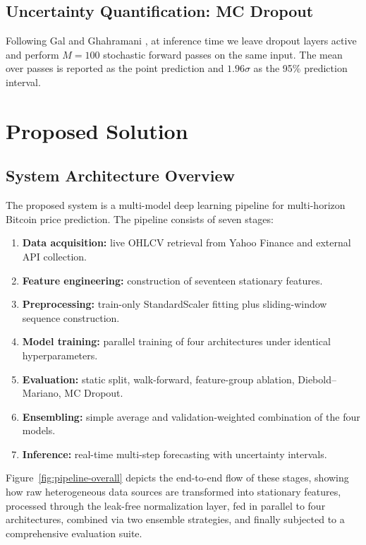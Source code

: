 \documentclass[12pt]{article}
\begin{document}
\subsection{Uncertainty Quantification: MC Dropout}

Following Gal and Ghahramani \cite{galghahramani2016}, at inference time we leave dropout layers active and perform $M = 100$ stochastic forward passes on the same input. The mean over passes is reported as the point prediction and $1.96\sigma$ as the 95\% prediction interval.

\section{Proposed Solution}

\subsection{System Architecture Overview}

The proposed system is a multi-model deep learning pipeline for multi-horizon Bitcoin price prediction. The pipeline consists of seven stages:
\begin{enumerate}[leftmargin=*]
    \item \textbf{Data acquisition:} live OHLCV retrieval from Yahoo Finance and external API collection.
    \item \textbf{Feature engineering:} construction of seventeen stationary features.
    \item \textbf{Preprocessing:} train-only StandardScaler fitting plus sliding-window sequence construction.
    \item \textbf{Model training:} parallel training of four architectures under identical hyperparameters.
    \item \textbf{Evaluation:} static split, walk-forward, feature-group ablation, Diebold--Mariano, MC Dropout.
    \item \textbf{Ensembling:} simple average and validation-weighted combination of the four models.
    \item \textbf{Inference:} real-time multi-step forecasting with uncertainty intervals.
\end{enumerate}

Figure~\ref{fig:pipeline-overall} depicts the end-to-end flow of these stages, showing how raw heterogeneous data sources are transformed into stationary features, processed through the leak-free normalization layer, fed in parallel to four architectures, combined via two ensemble strategies, and finally subjected to a comprehensive evaluation suite.
\end{document}
